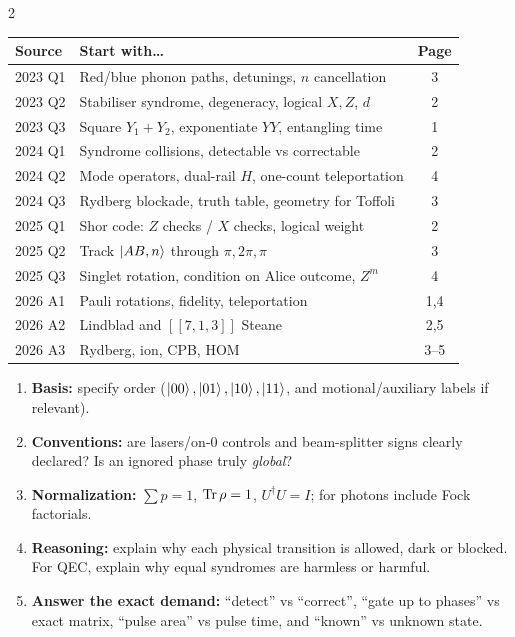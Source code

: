 \begin{multicols}{2}
\columnbreak
{}
\begin{center}\footnotesize
\begin{tabularx}{\linewidth}{@{}p{16mm}Xc@{}}\toprule
Source&Start with\ldots&Page\\\midrule
2023 Q1&Red/blue phonon paths, detunings, $n$ cancellation&3\\
2023 Q2&Stabiliser syndrome, degeneracy, logical $X,Z$, $d$&2\\
2023 Q3&Square $Y_1+Y_2$, exponentiate $YY$, entangling time&1\\
2024 Q1&Syndrome collisions, detectable vs correctable&2\\
2024 Q2&Mode operators, dual-rail $H$, one-count teleportation&4\\
2024 Q3&Rydberg blockade, truth table, geometry for Toffoli&3\\
2025 Q1&Shor code: $Z$ checks / $X$ checks, logical weight&2\\
2025 Q2&Track $\left\lvert AB,n\right\rangle$ through $\pi,2\pi,\pi$&3\\
2025 Q3&Singlet rotation, condition on Alice outcome, $Z^m$&4\\\midrule
2026 A1&Pauli rotations, fidelity, teleportation&1,4\\
2026 A2&Lindblad and $[[7,1,3]]$ Steane&2,5\\
2026 A3&Rydberg, ion, CPB, HOM&3--5\\
\bottomrule\end{tabularx}
\end{center}

\begin{enumerate}
\item \textbf{Basis:} specify order ($\left\lvert 00\right\rangle,\left\lvert 01\right\rangle,\left\lvert 10\right\rangle,\left\lvert 11\right\rangle$, and motional/auxiliary labels if relevant).
\item \textbf{Conventions:} are lasers/on-$0$ controls and beam-splitter signs clearly declared? Is an ignored phase truly \emph{global}?
\item \textbf{Normalization:} $\sum p=1$, $\operatorname{Tr}\rho=1$, $U^\dagger U=I$; for photons include Fock factorials.
\item \textbf{Reasoning:} explain why each physical transition is allowed, dark or blocked. For QEC, explain why equal syndromes are harmless or harmful.
\item \textbf{Answer the exact demand:} ``detect'' vs ``correct'', ``gate up to phases'' vs exact matrix, ``pulse area'' vs pulse time, and ``known'' vs unknown state.
\end{enumerate}


\end{multicols}
